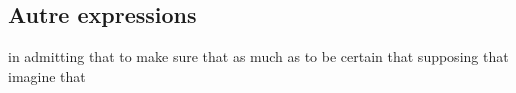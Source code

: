 \subsection*{Autre expressions}
   {in admitting that}
   {to make sure that}
   {as much as}
   {to be certain that}
   {supposing that}
   {imagine that}

